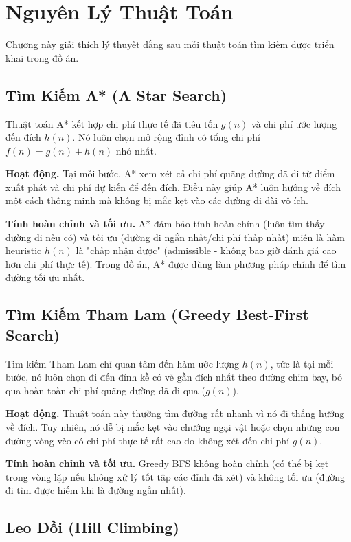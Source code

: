 \chapter{Nguyên Lý Thuật Toán}
\label{chap:algorithm-principles}

Chương này giải thích lý thuyết đằng sau mỗi thuật toán tìm kiếm được triển khai trong đồ án.

\section{Tìm Kiếm A* (A Star Search)}

Thuật toán A* kết hợp chi phí thực tế đã tiêu tốn $g(n)$ và chi phí ước lượng đến đích $h(n)$. Nó luôn chọn mở rộng đỉnh có tổng chi phí $f(n) = g(n) + h(n)$ nhỏ nhất.

\textbf{Hoạt động.} Tại mỗi bước, A* xem xét cả chi phí quãng đường đã đi từ điểm xuất phát và chi phí dự kiến để đến đích. Điều này giúp A* luôn hướng về đích một cách thông minh mà không bị mắc kẹt vào các đường đi dài vô ích.

\textbf{Tính hoàn chỉnh và tối ưu.} A* đảm bảo tính hoàn chỉnh (luôn tìm thấy đường đi nếu có) và tối ưu (đường đi ngắn nhất/chi phí thấp nhất) miễn là hàm heuristic $h(n)$ là "chấp nhận được" (admissible - không bao giờ đánh giá cao hơn chi phí thực tế). Trong đồ án, A* được dùng làm phương pháp chính để tìm đường tối ưu nhất.

\section{Tìm Kiếm Tham Lam (Greedy Best-First Search)}

Tìm kiếm Tham Lam chỉ quan tâm đến hàm ước lượng $h(n)$, tức là tại mỗi bước, nó luôn chọn đi đến đỉnh kề có vẻ gần đích nhất theo đường chim bay, bỏ qua hoàn toàn chi phí quãng đường đã đi qua ($g(n)$).

\textbf{Hoạt động.} Thuật toán này thường tìm đường rất nhanh vì nó đi thẳng hướng về đích. Tuy nhiên, nó dễ bị mắc kẹt vào chướng ngại vật hoặc chọn những con đường vòng vèo có chi phí thực tế rất cao do không xét đến chi phí $g(n)$.

\textbf{Tính hoàn chỉnh và tối ưu.} Greedy BFS không hoàn chỉnh (có thể bị kẹt trong vòng lặp nếu không xử lý tốt tập các đỉnh đã xét) và không tối ưu (đường đi tìm được hiếm khi là đường ngắn nhất).

\section{Leo Đồi (Hill Climbing)}

